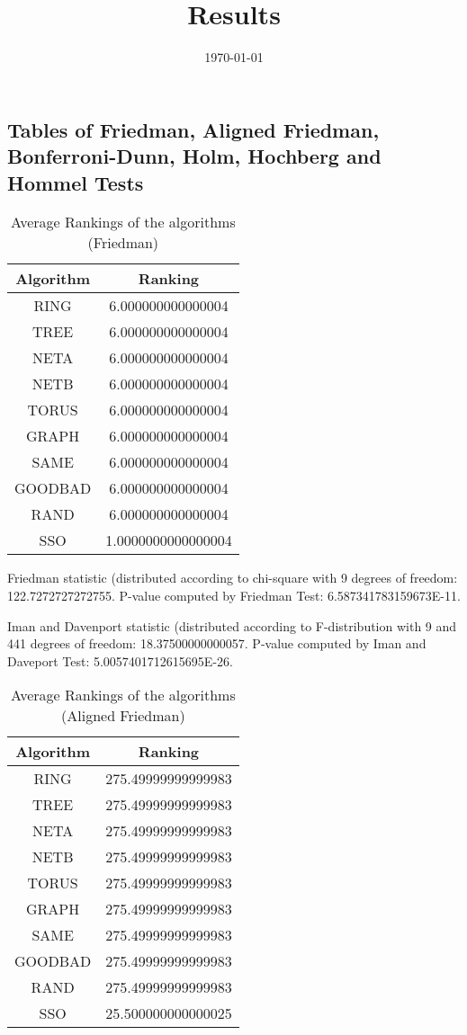 \documentclass[a4paper,10pt]{article}
\title{Results}
\author{}
\date{\today}
\begin{document}
\begin{landscape}
\oddsidemargin 0in \topmargin 0in\maketitle
\section{Tables of Friedman, Aligned Friedman, Bonferroni-Dunn, Holm, Hochberg and Hommel Tests}
\begin{table}[!htp]
\centering
\caption{Average Rankings of the algorithms (Friedman)
}\begin{tabular}{c|c}
Algorithm&Ranking\\
\hline
 RING&6.000000000000004\\
 TREE&6.000000000000004\\
 NETA&6.000000000000004\\
 NETB&6.000000000000004\\
 TORUS&6.000000000000004\\
 GRAPH&6.000000000000004\\
 SAME&6.000000000000004\\
 GOODBAD&6.000000000000004\\
 RAND&6.000000000000004\\
 SSO&1.0000000000000004\\
\end{tabular}
\end{table}


Friedman statistic (distributed according to chi-square with 9 degrees of freedom: 122.7272727272755. 
P-value computed by Friedman Test: 6.587341783159673E-11.\newline

Iman and Davenport statistic (distributed according to F-distribution with 9 and 441 degrees of freedom: 18.37500000000057. 
P-value computed by Iman and Daveport Test: 5.0057401712615695E-26.\newline


\newpage

\begin{table}[!htp]
\centering
\caption{Average Rankings of the algorithms (Aligned Friedman)
}\begin{tabular}{c|c}
Algorithm&Ranking\\
\hline
 RING&275.49999999999983\\
 TREE&275.49999999999983\\
 NETA&275.49999999999983\\
 NETB&275.49999999999983\\
 TORUS&275.49999999999983\\
 GRAPH&275.49999999999983\\
 SAME&275.49999999999983\\
 GOODBAD&275.49999999999983\\
 RAND&275.49999999999983\\
 SSO&25.500000000000025\\
\end{tabular}
\end{table}



\end{landscape}
\end{document}
